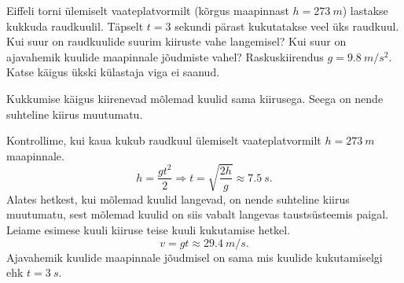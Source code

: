 
Eiffeli torni ülemiselt vaateplatvormilt (kõrgus maapinnast
$h=\SI{273}{m}$) lastakse kukkuda raudkuulil. Täpselt $t=3$ sekundi pärast kukutatakse
veel üks raudkuul. Kui suur on raudkuulide suurim
kiiruste vahe langemisel? Kui suur on ajavahemik kuulide maapinnale jõudmiste
vahel? Raskuskiirendus $g=\SI{9.8}{m/s^2}$. Katse käigus ükski külastaja viga ei saanud.

\hint
Kukkumise käigus kiirenevad mõlemad kuulid sama kiirusega. Seega on nende suhteline kiirus muutumatu.

\solu
Kontrollime, kui kaua kukub raudkuul ülemiselt vaateplatvormilt $h=\SI{273}{m}$ maapinnale.
\[h=\frac{gt^2}{2} \Rightarrow t=\sqrt{\frac{2h}{g}}\approx \SI{7.5}{s}.\]
Alates hetkest, kui mõlemad kuulid langevad, on nende suhteline kiirus muutumatu, sest mõlemad kuulid on siis vabalt langevas taustsüsteemis paigal.
Leiame esimese kuuli kiiruse teise kuuli kukutamise hetkel.
\[v=gt\approx \SI{29.4}{m/s}.\]
Ajavahemik kuulide maapinnale jõudmisel on sama mis kuulide kukutamiselgi ehk $t=\SI{3}{s}$.
\probend